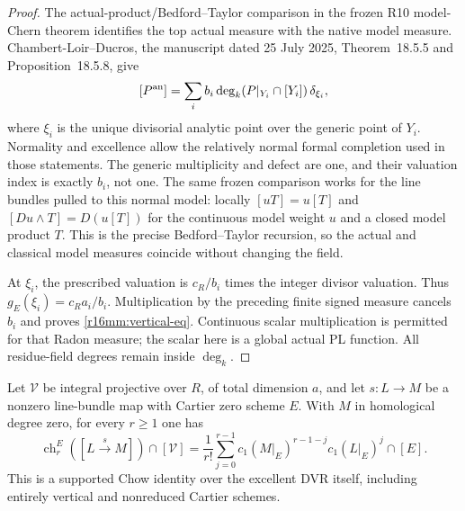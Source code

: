 \begin{proof}
The actual-product/Bedford--Taylor comparison in the frozen
R10 model-Chern theorem identifies the top actual measure with
the native model measure. Chambert-Loir--Ducros, the manuscript
dated 25 July 2025, Theorem~18.5.5 and Proposition~18.5.8, give
\[
 [P^{\rm an}]=\sum_i b_i\deg_k(P|_{Y_i}\cap[Y_i])\,\delta_{\xi_i},
\]
where $\xi_i$ is the unique divisorial analytic point over the
generic point of $Y_i$. Normality and excellence allow the
relatively normal formal completion used in those statements.
The generic multiplicity and defect are one, and their valuation
index is exactly $b_i$, not one. The same frozen comparison works
for the line bundles pulled to this normal model: locally
$[uT]=u[T]$ and $[Du\wedge T]=D(u[T])$ for the continuous model
weight $u$ and a closed model product $T$. This is the precise
Bedford--Taylor recursion, so the actual and classical model
measures coincide without changing the field.

At $\xi_i$, the prescribed valuation is $c_R/b_i$ times the
integer divisor valuation. Thus $g_E(\xi_i)=c_Ra_i/b_i$.
Multiplication by the preceding finite signed measure cancels
$b_i$ and proves \eqref{r16mm:vertical-eq}. Continuous scalar
multiplication is permitted for that Radon measure; the scalar
here is a global actual PL function. All residue-field degrees
remain inside $\deg_k$.
\end{proof}

\begin{lemma}
\label{r16mm:cartier}
Let $\mathcal V$ be integral projective over $R$, of total
dimension $a$, and let $s:L\to M$ be a nonzero line-bundle
map with Cartier zero scheme $E$. With $M$ in homological
degree zero, for every $r\geq1$ one has
\[
 \operatorname{ch}_r^E([L\xrightarrow{s}M])\cap[\mathcal V]
  =\frac1{r!}\sum_{j=0}^{r-1}
        c_1(M|_E)^{r-1-j}c_1(L|_E)^j\cap[E].
 \tag{MM16.2}\label{r16mm:cartier-eq}
\]
This is a supported Chow identity over the excellent DVR itself,
including entirely vertical and nonreduced Cartier schemes.
\end{lemma}


